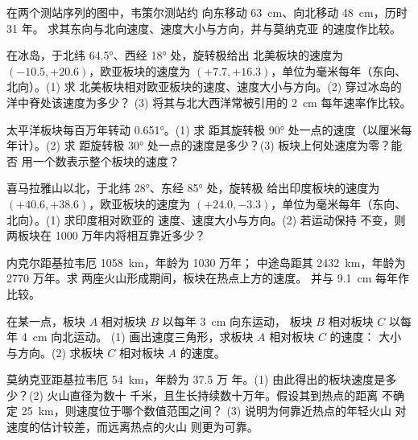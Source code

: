 \begin{exercise}[$\star\star$]\label{exo:g11:plate-motions:6}
在两个测站序列的图中，韦策尔测站约
向东移动 \qty{63}{cm}、向北移动 \qty{48}{cm}，历时 31 年。
求其东向与北向速度、速度大小与方向，并与莫纳克亚
的速度作比较。
\end{exercise}

\begin{exercise}[$\star\star$]\label{exo:g11:plate-motions:7}
在冰岛，于北纬 \ang{64.5}、西经 \ang{18} 处，旋转极给出
北美板块的速度为 $(-10.5, +20.6)$，欧亚板块的速度为
$(+7.7, +16.3)$，单位为毫米每年（东向、北向）。(1) 求
北美板块相对欧亚板块的速度、速度大小与方向。(2) 穿过冰岛的洋中脊处该速度为多少？
(3) 将其与北大西洋常被引用的
\qty{2}{cm} 每年速率作比较。
\end{exercise}

\begin{exercise}[$\star\star$]\label{exo:g11:plate-motions:8}
太平洋板块每百万年转动 \ang{0.651}。(1) 求
距其旋转极 \ang{90} 处一点的速度（以厘米每年计）。(2) 求
距旋转极 \ang{30} 处一点的速度是多少？(3) 板块上何处速度为零？能否
用一个数表示整个板块的速度？
\end{exercise}

\begin{exercise}[$\star\star$]\label{exo:g11:plate-motions:9}
喜马拉雅山以北，于北纬 \ang{28}、东经 \ang{85} 处，旋转极
给出印度板块的速度为 $(+40.6, +38.6)$，欧亚板块的速度为
$(+24.0, -3.3)$，单位为毫米每年（东向、北向）。(1) 求印度相对欧亚的
速度、速度大小与方向。(2) 若运动保持
不变，则两板块在 1000 万年内将相互靠近多少？
\end{exercise}

\begin{exercise}[$\star\star$]\label{exo:g11:plate-motions:10}
内克尔距基拉韦厄 \qty{1058}{km}，年龄为 1030 万年；
中途岛距其 \qty{2432}{km}，年龄为 2770 万年。求
两座火山形成期间，板块在热点上方的速度。
并与 \qty{9.1}{cm} 每年作比较。
\end{exercise}

\begin{exercise}[$\star\star$]\label{exo:g11:plate-motions:11}
在某一点，板块 $A$ 相对板块 $B$ 以每年 \qty{3}{cm} 向东运动，
板块 $B$ 相对板块 $C$ 以每年 \qty{4}{cm} 向北运动。
(1) 画出速度三角形，求板块 $A$ 相对板块 $C$ 的速度：
大小与方向。(2) 求板块 $C$ 相对板块 $A$ 的速度。
\end{exercise}

\begin{exercise}[$\star\star\star$]\label{exo:g11:plate-motions:12}
莫纳克亚距基拉韦厄 \qty{54}{km}，年龄为 37.5 万
年。(1) 由此得出的板块速度是多少？(2) 火山直径为数十
千米，且生长持续数十万年。假设其到热点的距离
不确定 \qty{25}{km}，则速度位于哪个数值范围之间？
(3) 说明为何靠近热点的年轻火山
对速度的估计较差，而远离热点的火山
则更为可靠。
\end{exercise}


